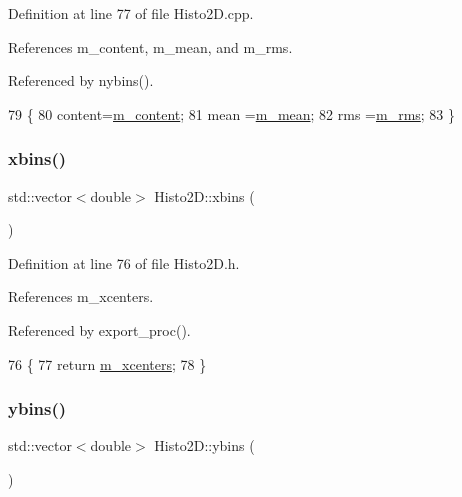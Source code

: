 Definition at line 77 of file Histo2\+D.\+cpp.



References m\+\_\+content, m\+\_\+mean, and m\+\_\+rms.



Referenced by nybins().


\begin{DoxyCode}
79                                      \{
80   content=\hyperlink{classHisto2D_ab70be93148e5c9b24e48b60c6b3b5f89}{m\_content};
81   mean   =\hyperlink{classHisto2D_a78286e1d11cc657a5fd1bd1f60c8dff9}{m\_mean};
82   rms    =\hyperlink{classHisto2D_a461938b95bb93a810ae7941a181023cc}{m\_rms};
83 \}
\end{DoxyCode}
\mbox{\label{classHisto2D_a8f42529a5fba07c339e547bf504dd418}} 
\subsubsection{\texorpdfstring{xbins()}{xbins()}}
{\footnotesize\ttfamily std\+::vector$<$double$>$ Histo2\+D\+::xbins (\begin{DoxyParamCaption}{ }\end{DoxyParamCaption})\hspace{0.3cm}{\ttfamily [inline]}}



Definition at line 76 of file Histo2\+D.\+h.



References m\+\_\+xcenters.



Referenced by export\+\_\+proc().


\begin{DoxyCode}
76                            \{  
77     \textcolor{keywordflow}{return} \hyperlink{classHisto2D_aa2e8211f89d086e1c0beaf3b7d18c568}{m\_xcenters};
78   \}
\end{DoxyCode}
\mbox{\label{classHisto2D_a0ae225e33eb9837137b10a159ac1d4f2}} 
\subsubsection{\texorpdfstring{ybins()}{ybins()}}
{\footnotesize\ttfamily std\+::vector$<$double$>$ Histo2\+D\+::ybins (\begin{DoxyParamCaption}{ }\end{DoxyParamCaption})\hspace{0.3cm}{\ttfamily [inline]}}



